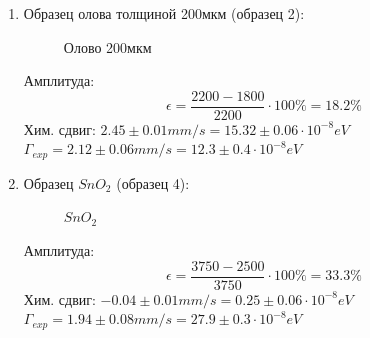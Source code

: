 \documentclass[12pt,a4paper]{article}
\begin{document}
\begin{enumerate}
\item Образец олова толщиной 200мкм (образец 2):

\begin{figure}[ht!]
\caption{Олово 200мкм}
\end{figure}


Амплитуда: 
\begin{equation*}
\epsilon = \frac{2200 - 1800}{2200} \cdot 100\% = 18.2 \%
\end{equation*}
Хим. сдвиг: $2.45 \pm 0.01 mm/s = 15.32 \pm 0.06 \cdot 10^{-8} eV$ \\
$\Gamma_{exp} = 2.12 \pm 0.06 mm/s = 12.3 \pm 0.4 \cdot 10^{-8} eV$ \\

\newpage

\item Образец $SnO_2$ (образец 4):

\begin{figure}[ht]
\caption{$SnO_2$}
\end{figure}
Амплитуда: 
\begin{equation*}
\epsilon = \frac{3750 - 2500}{3750} \cdot 100\% = 33.3 \%
\end{equation*}
Хим. сдвиг: $-0.04 \pm 0.01 mm/s = 0.25 \pm 0.06 \cdot 10^{-8} eV$ \\
$\Gamma_{exp} = 1.94 \pm 0.08 mm/s = 27.9 \pm 0.3 \cdot 10^{-8} eV$ \\

\end{enumerate}
\end{document}
